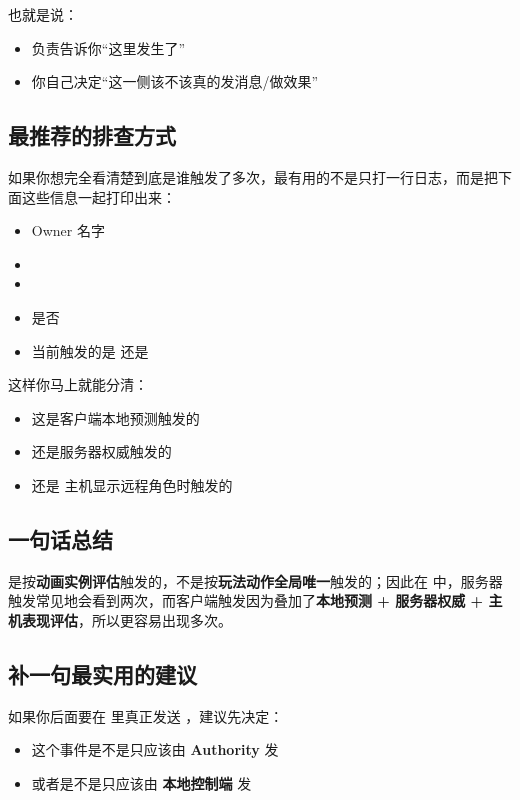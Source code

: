 也就是说：

\begin{itemize}
	\item {} 负责告诉你“这里发生了”
	\item 你自己决定“这一侧该不该真的发消息/做效果”
\end{itemize}

\subsection{最推荐的排查方式}

如果你想完全看清楚到底是谁触发了多次，最有用的不是只打一行日志，而是把下面这些信息一起打印出来：

\begin{itemize}
	\item Owner 名字
	\item {}
	\item {}
	\item 是否 
	\item 当前触发的是  还是 
\end{itemize}

这样你马上就能分清：

\begin{itemize}
	\item 这是客户端本地预测触发的
	\item 还是服务器权威触发的
	\item 还是  主机显示远程角色时触发的
\end{itemize}

\subsection{一句话总结}

 是按\textbf{动画实例评估}触发的，不是按\textbf{玩法动作全局唯一}触发的；因此在  中，服务器触发常见地会看到两次，而客户端触发因为叠加了\textbf{本地预测 + 服务器权威 + 主机表现评估}，所以更容易出现多次。

\subsection{补一句最实用的建议}

如果你后面要在  里真正发送 ，建议先决定：

\begin{itemize}
	\item 这个事件是不是只应该由 \textbf{Authority} 发
	\item 或者是不是只应该由 \textbf{本地控制端} 发
\end{itemize}

